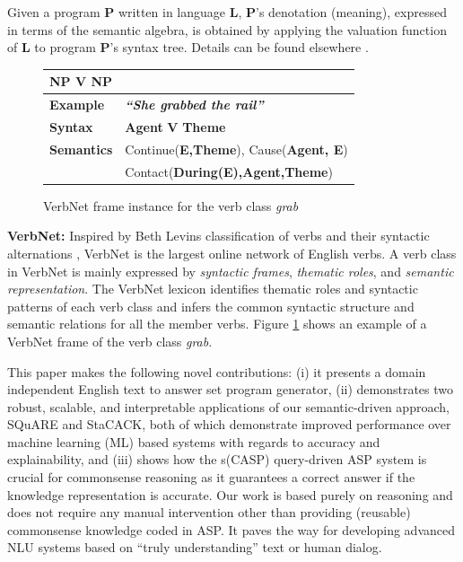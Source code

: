 \documentclass[letterpaper]{article}
\begin{document}
\noindent Given a program \textbf{P} written in language \textbf{L}, \textbf{P}'s denotation (meaning), expressed in terms of the semantic algebra, is obtained by applying the valuation function of \textbf{L} to program \textbf{P}'s syntax tree. Details can be found elsewhere \cite{d_semantics}.

\begin{figure}[t]
\tiny
\centering
\begin{tabular}{|p{1.2cm}|p{6cm}|}
    \hline
     \multicolumn{2}{|l|}{\textbf{NP V NP}}   \\
    \hline
    \textbf{Example}  & \textbf{\textit{``She grabbed the rail''}} \\
    \hline
    \textbf{Syntax}  & \textbf{Agent} \textbf{V} \textbf{Theme}  \\
    \hline
    \textbf{Semantics}  & \textcolor{burgundy}{Continue(}\textbf{E,Theme}\textcolor{burgundy}{)}, \textcolor{burgundy}{Cause(}\textbf{Agent, E}\textcolor{burgundy}{)}\\
    & \textcolor{burgundy}{Contact(}\textbf{During(E),Agent,Theme}\textcolor{burgundy}{)} \\
    \hline
\end{tabular}
\caption{VerbNet frame instance for the verb class \textit{grab}}
    \label{fig:verbnet-example}
\end{figure}

\medskip

\noindent\textbf{VerbNet:}
Inspired by Beth Levins classification of verbs and their syntactic alternations \cite{verbclasses}, VerbNet \cite{vn} is the largest online network of English verbs. A verb class in VerbNet is mainly expressed by \textit{syntactic frames}, \textit{thematic roles},  and  \textit{semantic representation}. The VerbNet
lexicon identifies  thematic roles and  syntactic patterns of each verb class and infers the common syntactic structure and semantic relations for all the member verbs. Figure \ref{fig:verbnet-example} shows an example of a VerbNet frame of the verb class \textit{grab}.





This paper makes the following novel contributions: (i) it presents a domain independent English text to answer set program generator, (ii) demonstrates two robust, scalable, and interpretable applications of our semantic-driven approach, SQuARE and StaCACK, both of which
demonstrate improved performance over machine learning (ML) based systems with regards to accuracy and explainability,
and (iii) shows how the s(CASP) query-driven ASP system is crucial for commonsense reasoning as it guarantees a correct answer if the knowledge representation is accurate.
Our work is based purely on reasoning and does not require any manual intervention other than providing (reusable) commonsense knowledge coded in ASP. It paves the way for developing advanced NLU systems based on ``truly understanding''  text or human dialog.
\end{document}

